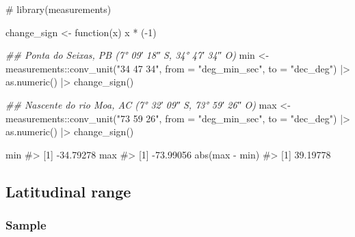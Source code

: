 \documentclass[
  12pt,
  a4paper,
  oneside]{tesesusp}
\newenvironment{Shaded}{\begin{snugshade}}{\end{snugshade}}
\newcommand{\AttributeTok}[1]{\textcolor[rgb]{0.40,0.45,0.13}{#1}}
\newcommand{\CommentTok}[1]{\textcolor[rgb]{0.37,0.37,0.37}{#1}}
\newcommand{\ControlFlowTok}[1]{\textcolor[rgb]{0.00,0.23,0.31}{#1}}
\newcommand{\DecValTok}[1]{\textcolor[rgb]{0.68,0.00,0.00}{#1}}
\newcommand{\DocumentationTok}[1]{\textcolor[rgb]{0.37,0.37,0.37}{\textit{#1}}}
\newcommand{\FunctionTok}[1]{\textcolor[rgb]{0.28,0.35,0.67}{#1}}
\newcommand{\NormalTok}[1]{\textcolor[rgb]{0.00,0.23,0.31}{#1}}
\newcommand{\OtherTok}[1]{\textcolor[rgb]{0.00,0.23,0.31}{#1}}
\newcommand{\SpecialCharTok}[1]{\textcolor[rgb]{0.37,0.37,0.37}{#1}}
\newcommand{\StringTok}[1]{\textcolor[rgb]{0.13,0.47,0.30}{#1}}
\begin{document}
\begin{Shaded}
\begin{Highlighting}[numbers=left,,]
\CommentTok{\# library(measurements)}

\NormalTok{change\_sign }\OtherTok{\textless{}{-}} \ControlFlowTok{function}\NormalTok{(x) x }\SpecialCharTok{*}\NormalTok{ (}\SpecialCharTok{{-}}\DecValTok{1}\NormalTok{)}

\DocumentationTok{\#\# Ponta do Seixas, PB (7° 09′ 18″ S, 34° 47′ 34″ O)}
\NormalTok{min }\OtherTok{\textless{}{-}} 
\NormalTok{  measurements}\SpecialCharTok{::}\FunctionTok{conv\_unit}\NormalTok{(}\StringTok{"34 47 34"}\NormalTok{, }\AttributeTok{from =} \StringTok{"deg\_min\_sec"}\NormalTok{, }\AttributeTok{to =} \StringTok{"dec\_deg"}\NormalTok{) }\SpecialCharTok{|\textgreater{}}
  \FunctionTok{as.numeric}\NormalTok{() }\SpecialCharTok{|\textgreater{}}
  \FunctionTok{change\_sign}\NormalTok{()}

\DocumentationTok{\#\# Nascente do rio Moa, AC (7° 32′ 09″ S, 73° 59′ 26″ O)}
\NormalTok{max }\OtherTok{\textless{}{-}} 
\NormalTok{  measurements}\SpecialCharTok{::}\FunctionTok{conv\_unit}\NormalTok{(}\StringTok{"73 59 26"}\NormalTok{, }\AttributeTok{from =} \StringTok{"deg\_min\_sec"}\NormalTok{, }\AttributeTok{to =} \StringTok{"dec\_deg"}\NormalTok{) }\SpecialCharTok{|\textgreater{}}
  \FunctionTok{as.numeric}\NormalTok{() }\SpecialCharTok{|\textgreater{}}
  \FunctionTok{change\_sign}\NormalTok{()}

\NormalTok{min}
\CommentTok{\#\textgreater{} [1] {-}34.79278}
\NormalTok{max}
\CommentTok{\#\textgreater{} [1] {-}73.99056}
\FunctionTok{abs}\NormalTok{(max }\SpecialCharTok{{-}}\NormalTok{ min)}
\CommentTok{\#\textgreater{} [1] 39.19778}
\end{Highlighting}
\end{Shaded}

\hypertarget{latitudinal-range}{%
\subsection{Latitudinal range}\label{latitudinal-range}}

\hypertarget{sample-2}{%
\subsubsection{Sample}\label{sample-2}}
\end{document}
